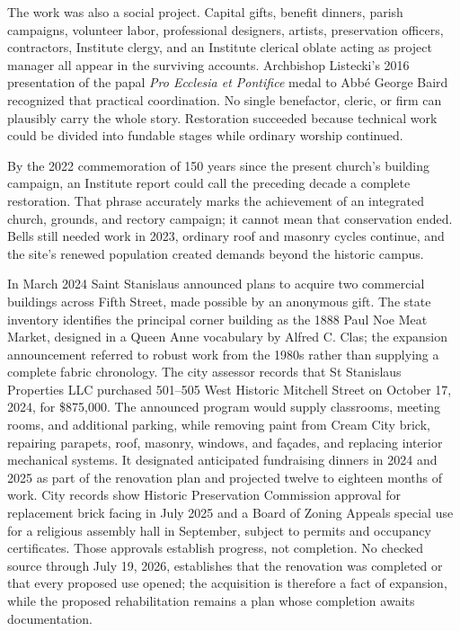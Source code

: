 The work was also a social project. Capital gifts, benefit dinners, parish campaigns, volunteer labor, professional designers, artists, preservation officers, contractors, Institute clergy, and an Institute clerical oblate acting as project manager all appear in the surviving accounts. Archbishop Listecki's 2016 presentation of the papal \emph{Pro Ecclesia et Pontifice} medal to Abb\'e George Baird recognized that practical coordination. No single benefactor, cleric, or firm can plausibly carry the whole story. Restoration succeeded because technical work could be divided into fundable stages while ordinary worship continued.

By the 2022 commemoration of 150 years since the present church's building campaign, an Institute report could call the preceding decade a complete restoration. That phrase accurately marks the achievement of an integrated church, grounds, and rectory campaign; it cannot mean that conservation ended. Bells still needed work in 2023, ordinary roof and masonry cycles continue, and the site's renewed population created demands beyond the historic campus.

In March 2024 Saint Stanislaus announced plans to acquire two commercial buildings across Fifth Street, made possible by an anonymous gift. The state inventory identifies the principal corner building as the 1888 Paul Noe Meat Market, designed in a Queen Anne vocabulary by Alfred C. Clas; the expansion announcement referred to robust work from the 1980s rather than supplying a complete fabric chronology. The city assessor records that St Stanislaus Properties LLC purchased 501--505 West Historic Mitchell Street on October 17, 2024, for \$875,000. The announced program would supply classrooms, meeting rooms, and additional parking, while removing paint from Cream City brick, repairing parapets, roof, masonry, windows, and façades, and replacing interior mechanical systems. It designated anticipated fundraising dinners in 2024 and 2025 as part of the renovation plan and projected twelve to eighteen months of work. City records show Historic Preservation Commission approval for replacement brick facing in July 2025 and a Board of Zoning Appeals special use for a religious assembly hall in September, subject to permits and occupancy certificates. Those approvals establish progress, not completion. No checked source through July 19, 2026, establishes that the renovation was completed or that every proposed use opened; the acquisition is therefore a fact of expansion, while the proposed rehabilitation remains a plan whose completion awaits documentation.
